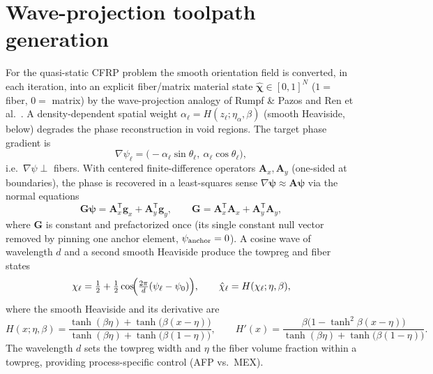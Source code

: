 \documentclass[11pt]{article}
\newcommand{\vA}{\mathbf{A}}
\newcommand{\vG}{\mathbf{G}}
\newcommand{\vchi}{\hat{\bm{\chi}}}
\newcommand{\T}{^{\mathsf{T}}}
\newcommand{\half}{\tfrac12}
\begin{document}
\section{Wave-projection toolpath generation}
\label{sec:wave}
For the quasi-static CFRP problem the smooth orientation field is converted, in
each iteration, into an explicit fiber/matrix material state
$\vchi\in[0,1]^N$ ($1=$ fiber, $0=$ matrix) by the wave-projection analogy of
Rumpf \& Pazos and Ren et al.~\cite{ren2024}. A density-dependent spatial weight
$\alpha_\ell=H(z_\ell;\eta_\alpha,\beta)$ (smooth Heaviside, below) degrades the
phase reconstruction in void regions. The target phase gradient is
\begin{equation}
  \nabla\psi_\ell=\bigl(-\alpha_\ell\sin\theta_\ell,\ \alpha_\ell\cos\theta_\ell
  \bigr),
\end{equation}
i.e.\ $\nabla\psi\perp$ fibers. With centered finite-difference operators
$\vA_x,\vA_y$ (one-sided at boundaries), the phase is recovered in a
least-squares sense $\nabla\bm\psi\approx\vA\bm\psi$ via the normal equations
\begin{equation}
  \vG\bm\psi=\vA_x\T\mathbf{g}_x+\vA_y\T\mathbf{g}_y,\qquad
  \vG=\vA_x\T\vA_x+\vA_y\T\vA_y,
  \label{eq:phase}
\end{equation}
where $\vG$ is constant and prefactorized once (its single constant null vector
removed by pinning one anchor element, $\psi_{\rm anchor}=0$). A cosine wave of
wavelength $d$ and a second smooth Heaviside produce the towpreg and fiber states
\begin{equation}
  \chi_\ell=\half+\half\cos\!\Bigl(\tfrac{2\pi}{d}(\psi_\ell-\psi_0)\Bigr),\qquad
  \hat\chi_\ell=H(\chi_\ell;\eta,\beta),
  \label{eq:chi}
\end{equation}
where the smooth Heaviside and its derivative are
\begin{equation}
  H(x;\eta,\beta)=\frac{\tanh(\beta\eta)+\tanh\!\bigl(\beta(x-\eta)\bigr)}
  {\tanh(\beta\eta)+\tanh\!\bigl(\beta(1-\eta)\bigr)},\qquad
  H'(x)=\frac{\beta\bigl(1-\tanh^2\!\beta(x-\eta)\bigr)}
  {\tanh(\beta\eta)+\tanh\!\bigl(\beta(1-\eta)\bigr)}.
  \label{eq:heavi}
\end{equation}
The wavelength $d$ sets the towpreg width and $\eta$ the fiber volume fraction
within a towpreg, providing process-specific control (AFP vs.\ MEX).
\end{document}
